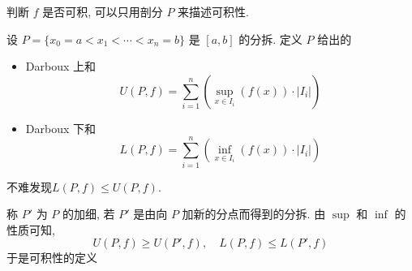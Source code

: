 判断 $f$ 是否可积, 可以只用剖分 $P$ 来描述可积性. 
\begin{definition}
  设 $P = \{ x_0 = a < x_1 < \cdots < x_{n} = b \}$ 是 $[a,b]$ 的分拆.
  定义 $P$ 给出的
  \begin{itemize}
    \item Darboux 上和
      \begin{equation}
        U \left( P , f \right) = \sum_{i=1}^{n} \left( \sup_{x \in I_{i}} \left( f(x) \right) \cdot |I_{i}| \right)
      \end{equation}
      
    \item Darboux 下和
      \begin{equation}
        L \left( P , f \right) = \sum_{i=1}^{n} \left( \inf_{x \in I_{i}} \left( f(x) \right) \cdot |I_{i}| \right)
      \end{equation}
  \end{itemize}
  不难发现$ L\left( P,f \right) \le U(P,f)$.
\end{definition}
称 $P'$ 为 $P$ 的加细, 若 $P'$ 是由向 $P$ 加新的分点而得到的分拆.
由 $\sup$ 和 $\inf$ 的性质可知, 
\begin{equation}
  U\left( P,f \right) \ge U(P',f) , \quad L \left( P, f \right) \le L \left( P', f \right)
\end{equation}
于是可积性的定义
